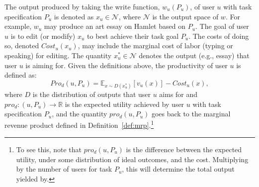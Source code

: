 {The output produced by taking the write function, $w_u(P_u)$, of user $u$ with task specification $P_u$ is denoted as $x_u \in \mathcal{N}$, where $\mathcal{N}$ is the output space of $w$.
For example, $w_u$ may produce an art essay on Hamlet based on $P_u$.
The goal of user $u$ is to edit (or modify) $x_u$ to best achieve their task goal $P_u$.
The costs of doing so, denoted $Cost_u(x_u)$, may include the marginal cost of labor (typing or speaking) for editing.
The quantity $x^*_u \in \mathcal{N}$ denotes the output (e.g., essay) that user $u$ is aiming for.
Given the definitions above, the productivity of user $u$ is defined as:
\begin{equation}
    Pro_d(u, P_u) = \mathbb{E}_{x \sim D (x^*_u)} \left[ v_u \left( x \right) \right] - Cost_u \left( x \right),
\end{equation}
where $D$ is the distribution of outputs that user $u$ aims for and $pro_d: (u, P_u) \to \mathbb{R}$ is the expected utility achieved by user $u$ with task specification $P_u$, and the quantity $pro_d(u, P_u)$ goes back to the marginal revenue product defined in Definition~\ref{def:mrp}.\footnote{To see this, note that $pro_d(u, P_u)$ is the difference between the expected utility, under some distribution of ideal outcomes, and the cost. Multiplying by the number of users for task $P_u$, this will determine the total output yielded by.

}}
